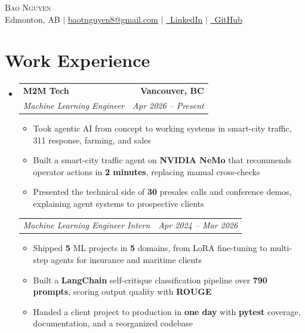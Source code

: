 \documentclass[letterpaper,11pt]{article}
\makeatletter
\newcommand{\resumeItem}[1]{
  \item\small{
    {#1 \vspace{-3pt}}
  }
}
\newcommand{\resumeSubheading}[4]{
  \vspace{-3pt}\item
    \begin{tabular*}{1.0\textwidth}[t]{l@{\extracolsep{\fill}}r}
      \textbf{#1} & \textbf{\small #2} \\
      \textit{\small#3} & \textit{\small #4} \\
    \end{tabular*}\vspace{-7pt}
}
\newcommand{\resumeSubheadingContinue}[2]{
  \vspace{-3pt}
    \begin{tabular*}{1.0\textwidth}[t]{l@{\extracolsep{\fill}}r}
      \textit{\small#1} & \textit{\small #2} \\
    \end{tabular*}\vspace{-7pt}
}
\newcommand{\resumeSubHeadingListStart}{\begin{itemize}[leftmargin=0.0in, label={}]}
\newcommand{\resumeSubHeadingListEnd}{\end{itemize}}
\newcommand{\resumeItemListStart}{\begin{itemize}}
\newcommand{\resumeItemListEnd}{\end{itemize}\vspace{0pt}}
\makeatother
\begin{document}
    \begin{center}
        {\Huge\scshape Bao Nguyen}
        \\[0.125cm] Edmonton, AB $|$
        \small
        \href{mailto:baotnguyen8@gmail.com}{\underline{baotnguyen8@gmail.com}} $|$
        \href{https://www.linkedin.com/in/bao-thanh-nguyen}{\faLinkedin\ \underline{LinkedIn}} $|$
        \href{https://github.com/BaoTNguyen}{\faGithub\ \underline{GitHub}}
    \end{center}

\section{Work Experience}
\begingroup
\renewcommand{\resumeSubheading}[4]{
  \vspace{-3pt}\item
    \begin{tabular*}{1.0\textwidth}[t]{l@{\extracolsep{\fill}}r}
      \textbf{#1} & \textbf{\small #4} \\
      \textit{\small#3} & \textit{\small #2} \\
    \end{tabular*}\vspace{-7pt}
}
  \resumeSubHeadingListStart
    \resumeSubheading
      {M2M Tech}{Apr 2026 -- Present}
      {Machine Learning Engineer}{Vancouver, BC}
      \resumeItemListStart
            \resumeItem{Took agentic AI from concept to working systems in smart-city traffic, 311 response, farming, and sales}
            \resumeItem{Built a smart-city traffic agent on \textbf{NVIDIA NeMo} that recommends operator actions in \textbf{2 minutes}, replacing manual cross-checks}
            \resumeItem{Presented the technical side of \textbf{30} presales calls and conference demos, explaining agent systems to prospective clients}
      \resumeItemListEnd

    \resumeSubheadingContinue
      {Machine Learning Engineer Intern}{Apr 2024 -- Mar 2026}
      \resumeItemListStart
            \resumeItem{Shipped \textbf{5} ML projects in \textbf{5} domains, from LoRA fine-tuning to multi-step agents for insurance and maritime clients}
            \resumeItem{Built a \textbf{LangChain} self-critique classification pipeline over \textbf{790 prompts}, scoring output quality with \textbf{ROUGE}}
            \resumeItem{Handed a client project to production in \textbf{one day} with \textbf{pytest} coverage, documentation, and a reorganized codebase}
      \resumeItemListEnd
  \resumeSubHeadingListEnd
\endgroup
\end{document}
